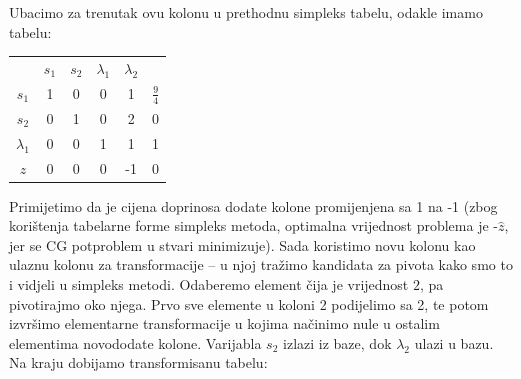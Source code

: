 \documentclass[a4paper, utf8, 11pt, colorlinks]{book}
\theoremstyle{definition}
\begin{document}
Ubacimo za trenutak ovu kolonu u prethodnu simpleks tabelu, odakle imamo tabelu: 

 \begin{center}
 	
 	\begin{tabular}{c|ccccc}
 	                &$s_1$        & $ s_2$   &  $\lambda_1$ & $\lambda_2$   &                \\
 		$s_1$	    &   1      &    0         &   0         &     1         &  $\frac{9}{4}$ \\
 		$s_2$	    &   0      &    1         &   0         &     2         &  0             \\
 		$\lambda_1$ &   0      &    0         &   1         &     1         &  1             \\ \hline
 		$z$         &   0      &    0         &   0         &    -1         &  0
 	\end{tabular}
 \end{center}
Primijetimo da je cijena doprinosa dodate kolone promijenjena sa 1 na -1 (zbog korištenja tabelarne forme simpleks metoda, optimalna vrijednost problema je -$\hat{z}$, jer se CG potproblem u stvari minimizuje). Sada koristimo novu kolonu kao ulaznu kolonu za transformacije -- u njoj tražimo kandidata za pivota kako smo to i vidjeli u simpleks metodi. Odaberemo element čija je vrijednost $2$, pa pivotirajmo oko njega. Prvo sve elemente u koloni 2 podijelimo sa 2, te potom izvršimo elementarne transformacije u kojima načinimo nule u ostalim elementima novododate kolone. Varijabla $s_2$ izlazi iz baze, dok $\lambda_2$ ulazi u bazu. Na kraju dobijamo transformisanu tabelu:
\end{document}

